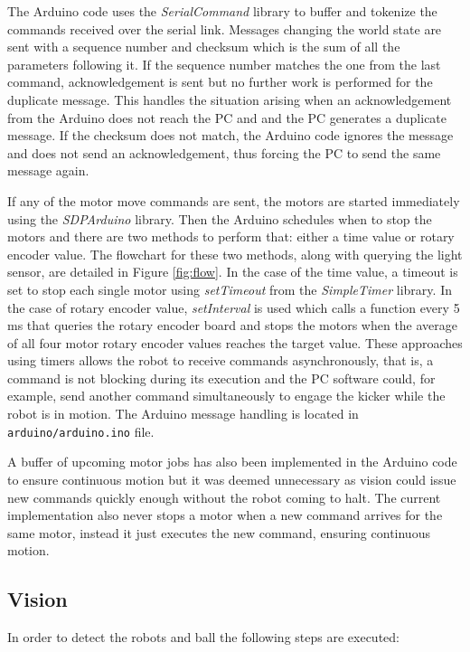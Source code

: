 \documentclass[a4paper,12pt]{article}
\begin{document}
The Arduino code uses the \textit{SerialCommand} library to buffer and tokenize the commands received over the serial link. Messages changing the world state are sent with a sequence number and checksum which is the sum of all the parameters following it. If the sequence number matches the one from the last command, acknowledgement is sent but no further work is performed for the duplicate message. This handles the situation arising when an acknowledgement from the Arduino does not reach the PC and and the PC generates a duplicate message. If the checksum does not match, the Arduino code ignores the message and does not send an acknowledgement, thus forcing the PC to send the same message again.

If any of the motor move commands are sent, the motors are started immediately using the \textit{SDPArduino} library. Then the Arduino schedules when to stop the motors and there are two methods to perform that: either a time value or rotary encoder value. The flowchart for these two methods, along with querying the light sensor, are detailed in Figure \ref{fig:flow}.
In the case of the time value, a timeout is set to stop each single motor using
\textit{setTimeout} from the \textit{SimpleTimer} library.
In the case of rotary encoder value, \textit{setInterval} is used which calls
a function every 5 ms that queries the rotary encoder board and stops the motors
when the average of all four motor rotary encoder values reaches the target value. These approaches using timers
allows the robot to receive commands asynchronously, that is, a command is not
blocking during its execution and the PC software could, for example, send another command simultaneously to engage the kicker while the robot is in motion.
The Arduino message handling is located in \texttt{arduino/arduino.ino} file.

A buffer of upcoming motor jobs has also been implemented in the Arduino code to ensure continuous motion but it was deemed unnecessary as vision could issue new commands quickly enough without the robot coming to halt. The current implementation also never stops a motor when a new command arrives for the same motor, instead it just executes the new command, ensuring continuous motion.

\subsection{Vision}

In order to detect the robots and ball the following steps are executed:
\end{document}
